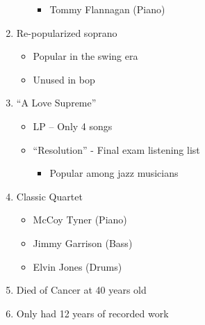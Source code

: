 \documentclass[]{article}
\providecommand{\tightlist}{%
  \setlength{\itemsep}{0pt}\setlength{\parskip}{0pt}}
\begin{document}
\begin{enumerate}
\begin{itemize}
    \begin{itemize}
    \tightlist
    \item
      Tommy Flannagan (Piano)
    \end{itemize}
  \end{itemize}
\item
  Re-popularized soprano

  \begin{itemize}
  \tightlist
  \item
    Popular in the swing era
  \item
    Unused in bop
  \end{itemize}
\item
  ``A Love Supreme''

  \begin{itemize}
  \tightlist
  \item
    LP -- Only 4 songs
  \item
    ``Resolution'' - Final exam listening list

    \begin{itemize}
    \tightlist
    \item
      Popular among jazz musicians
    \end{itemize}
  \end{itemize}
\item
  Classic Quartet

  \begin{itemize}
  \tightlist
  \item
    McCoy Tyner (Piano)
  \item
    Jimmy Garrison (Bass)
  \item
    Elvin Jones (Drums)
  \end{itemize}
\item
  Died of Cancer at 40 years old
\item
  Only had 12 years of recorded work
\end{enumerate}
\end{document}
